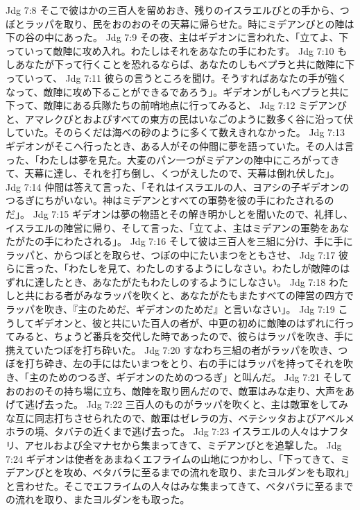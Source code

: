Jdg 7:8  そこで彼はかの三百人を留めおき、残りのイスラエルびとの手から、つぼとラッパを取り、民をおのおのその天幕に帰らせた。時にミデアンびとの陣は下の谷の中にあった。
Jdg 7:9  その夜、主はギデオンに言われた、「立てよ、下っていって敵陣に攻め入れ。わたしはそれをあなたの手にわたす。
Jdg 7:10  もしあなたが下って行くことを恐れるならば、あなたのしもべプラと共に敵陣に下っていって、
Jdg 7:11  彼らの言うところを聞け。そうすればあなたの手が強くなって、敵陣に攻め下ることができるであろう」。ギデオンがしもべプラと共に下って、敵陣にある兵隊たちの前哨地点に行ってみると、
Jdg 7:12  ミデアンびと、アマレクびとおよびすべての東方の民はいなごのように数多く谷に沿って伏していた。そのらくだは海べの砂のように多くて数えきれなかった。
Jdg 7:13  ギデオンがそこへ行ったとき、ある人がその仲間に夢を語っていた。その人は言った、「わたしは夢を見た。大麦のパン一つがミデアンの陣中にころがってきて、天幕に達し、それを打ち倒し、くつがえしたので、天幕は倒れ伏した」。
Jdg 7:14  仲間は答えて言った、「それはイスラエルの人、ヨアシの子ギデオンのつるぎにちがいない。神はミデアンとすべての軍勢を彼の手にわたされるのだ」。
Jdg 7:15  ギデオンは夢の物語とその解き明かしとを聞いたので、礼拝し、イスラエルの陣営に帰り、そして言った、「立てよ、主はミデアンの軍勢をあなたがたの手にわたされる」。
Jdg 7:16  そして彼は三百人を三組に分け、手に手にラッパと、からつぼとを取らせ、つぼの中にたいまつをともさせ、
Jdg 7:17  彼らに言った、「わたしを見て、わたしのするようにしなさい。わたしが敵陣のはずれに達したとき、あなたがたもわたしのするようにしなさい。
Jdg 7:18  わたしと共におる者がみなラッパを吹くと、あなたがたもまたすべての陣営の四方でラッパを吹き、『主のためだ、ギデオンのためだ』と言いなさい」。
Jdg 7:19  こうしてギデオンと、彼と共にいた百人の者が、中更の初めに敵陣のはずれに行ってみると、ちょうど番兵を交代した時であったので、彼らはラッパを吹き、手に携えていたつぼを打ち砕いた。
Jdg 7:20  すなわち三組の者がラッパを吹き、つぼを打ち砕き、左の手にはたいまつをとり、右の手にはラッパを持ってそれを吹き、「主のためのつるぎ、ギデオンのためのつるぎ」と叫んだ。
Jdg 7:21  そしておのおのその持ち場に立ち、敵陣を取り囲んだので、敵軍はみな走り、大声をあげて逃げ去った。
Jdg 7:22  三百人のものがラッパを吹くと、主は敵軍をしてみな互に同志打ちさせられたので、敵軍はゼレラの方、ベテシッタおよびアベルメホラの境、タバテの近くまで逃げ去った。
Jdg 7:23  イスラエルの人々はナフタリ、アセルおよび全マナセから集まってきて、ミデアンびとを追撃した。
Jdg 7:24  ギデオンは使者をあまねくエフライムの山地につかわし、「下ってきて、ミデアンびとを攻め、ベタバラに至るまでの流れを取り、またヨルダンをも取れ」と言わせた。そこでエフライムの人々はみな集まってきて、ベタバラに至るまでの流れを取り、またヨルダンをも取った。
